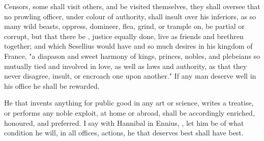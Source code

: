 Censors, some shall visit others, and be visited
 themselves, they shall oversee that no
prowling officer, under colour of authority, shall insult over his inferiors,
as so many wild beasts, oppress, domineer, flea, grind, or trample on, be
partial or corrupt, but that there be , justice equally done,
live as friends and brethren together; and which Sesellius
would have and so much desires in his kingdom of France, "a diapason and sweet
harmony of kings, princes, nobles, and plebeians so mutually tied and involved
in love, as well as laws and authority, as that they never disagree, insult, or
encroach one upon another." If any man deserve well in his office he shall be
rewarded.


He that invents anything for public good in any art or science, writes a
treatise, or performs any noble exploit, at home or abroad,
shall be accordingly enriched,
honoured, and preferred. I say with Hannibal in Ennius,
, let him be of what condition
he will, in all offices, actions, he that deserves best shall have best.

